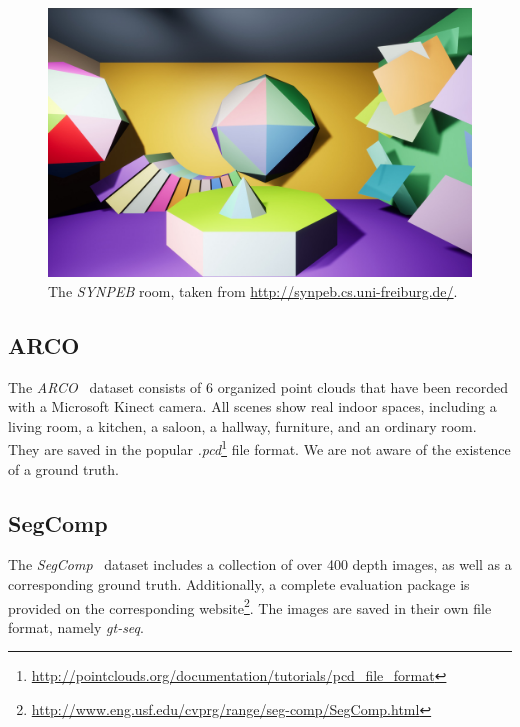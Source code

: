 \documentclass[main.tex]{subfiles}
\begin{document}
\begin{figure}[H]
    \centering
    \includegraphics[width=\textwidth]{images/synpeb_room.jpg}
    \caption[SYNPEB]{The \textit{SYNPEB} room, taken from \href{http://synpeb.cs.uni-freiburg.de/}{http://synpeb.cs.uni-freiburg.de/}.}
    \label{fig:SYNPEB}
\end{figure}

\subsection{ARCO}
\label{subsec:bg-ARCO}
The \textit{ARCO}~\cite{Hidalgo-Paniagua_Vega-Rodriguez_Pavón_Ferruz_2015} dataset consists of 6 organized point clouds that have been recorded with a Microsoft Kinect camera.
All scenes show real indoor spaces, including a living room, a kitchen, a saloon, a hallway, furniture, and an ordinary room.
They are saved in the popular \textit{.pcd}\footnote{\href{http://pointclouds.org/documentation/tutorials/pcd\_file\_format}{http://pointclouds.org/documentation/tutorials/pcd\_file\_format}} file format.
We are not aware of the existence of a ground truth.

\subsection{SegComp}
\label{subsec:bg-segcomp}
The \textit{SegComp}~\cite{article} dataset
includes a collection of over 400 depth images, as well as a corresponding ground truth. Additionally, a complete
evaluation package is provided on the corresponding website\footnote{\href{http://www.eng.usf.edu/cvprg/range/seg-comp/SegComp.html}{http://www.eng.usf.edu/cvprg/range/seg-comp/SegComp.html}}.
The images are saved in their own file format, namely \textit{gt-seq}.
\end{document}
